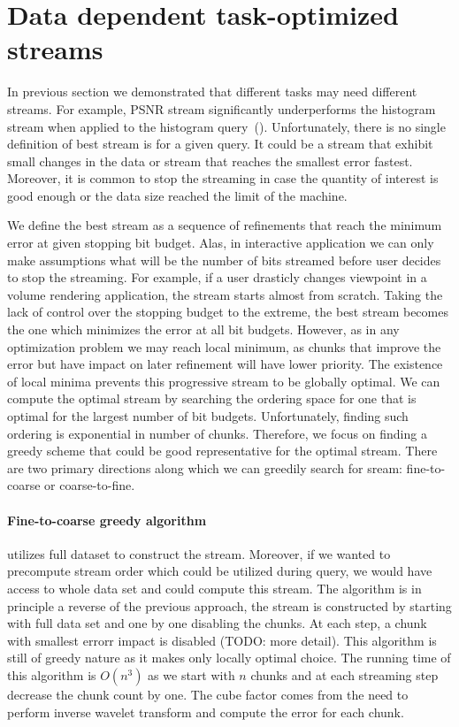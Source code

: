 \section{Data dependent task-optimized streams}
\label{sec:data_dep_streams}

In previous section we demonstrated that different tasks may need different streams. For example,
PSNR stream significantly underperforms the histogram stream when applied to the histogram
query~().
Unfortunately, there is no single definition of best stream is for a given query. It could be a stream that
exhibit small changes in the data or stream that reaches the smallest error fastest.
Moreover, it is common to stop the streaming in case the quantity of interest is good enough or the data size
reached the limit of the machine.

We define the best stream as
a sequence of refinements that reach the minimum error at given stopping bit budget. Alas, in interactive application
we can only make assumptions what will be the number of bits streamed before user decides to stop the streaming. For
example, if a user drasticly changes viewpoint in a volume rendering application, the stream starts almost from scratch.
Taking the lack of control over the stopping budget to the extreme, the best stream becomes the one which minimizes
the error at all bit budgets. However, as in any optimization problem we may reach local minimum, as
chunks that improve the error but have impact on later refinement will have lower priority. The existence of local
minima prevents this progressive stream to be globally optimal.
We can compute the optimal stream by searching the ordering space for one that is optimal for the largest number
of bit budgets. Unfortunately, finding such ordering is exponential in number of chunks. Therefore, we focus on
finding a greedy scheme that could be good representative for the optimal stream. There are two primary directions
along which we can greedily search for sream: fine-to-coarse or coarse-to-fine.

\paragraph*{Fine-to-coarse greedy algorithm} utilizes full dataset to construct the stream.
Moreover,
if we wanted to precompute stream order which could be utilized during query, we would have access to whole
data set and could compute this stream. The algorithm is in principle a reverse of the previous approach, the
stream is constructed by starting with full data set and one by one disabling the chunks. At each step, a chunk
with smallest errorr impact is disabled (TODO: more detail). This algorithm is still of greedy nature as it
makes only locally optimal choice.
The running time of this algorithm is $O(n^3)$ as we start with $n$ chunks
and at each streaming step decrease the chunk count by one. The cube factor comes from the need to perform inverse
wavelet transform and compute the error for each chunk.


